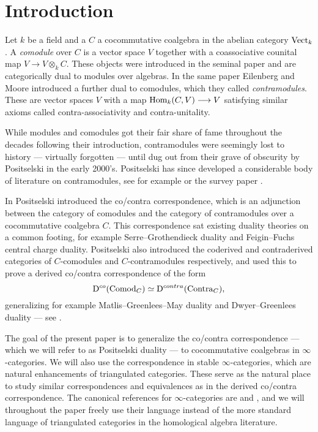 
\section{Introduction}

Let $k$ be a field and a $C$ a cocommutative coalgebra in the abelian category $\mathrm{Vect}_k$. A \emph{comodule} over $C$ is a vector space $V$ together with a coassociative counital map $V\to V\otimes_k C$. These objects were introduced in the seminal paper \cite{eilenberg-moore_65} and are categorically dual to modules over algebras. In the same paper Eilenberg and Moore introduced a further dual to comodules, which they called \emph{contramodules}. These are vector spaces $V$ with a map $\operatorname{Hom}_k(C, V)\longrightarrow V$ satisfying similar axioms called contra-associativity and contra-unitality. 

While modules and comodules got their fair share of fame throughout the decades following their introduction, contramodules were seemingly lost to history --- virtually forgotten --- until dug out from their grave of obscurity by Positselski in the early 2000's. Positselski has since developed a considerable body of literature on contramodules, see for example \cite{positselski_2010, positselski_2011, positselski_2016, positselski_2017_contraadjusted, positselski_2020} or the survey paper \cite{positselski_2022_contramodules}. 

In \cite{positselski_2010} Positselski introduced the co/contra correspondence, which is an adjunction between the category of comodules and the category of contramodules over a cocommutative coalgebra $C$. This correspondence sat existing duality theories on a common footing, for example Serre--Grothendieck duality and Feigin--Fuchs central charge duality. Positselski also introduced the coderived and contraderived categories of $C$-comodules and $C$-contramodules respectively, and used this to prove a derived co/contra correspondence of the form 
\[\mathrm{D}^{co}(\mathrm{Comod}_C)\simeq \mathrm{D}^{contra}(\mathrm{Contra}_C),\]
generalizing for example Matlis--Greenlees--May duality and Dwyer--Greenlees duality --- see \cite{positselski_2016}. 

The goal of the present paper is to generalize the co/contra correspondence --- which we will refer to as Positselski duality --- to cocommutative coalgebras in $\infty$-categories. We will also use the correspondence in stable $\infty$-categories, which are natural enhancements of triangulated categories. These serve as the natural place to study similar correspondences and equivalences as in the derived co/contra correspondence. The canonical references for $\infty$-categories are \cite{lurie_09} and \cite{Lurie_HA}, and we will throughout the paper freely use their language instead of the more standard language of triangulated categories in the homological algebra literature. 





